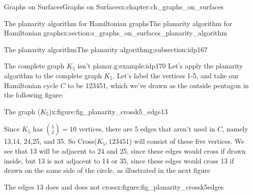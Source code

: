 \documentclass[oneside,10pt,]{book}
\numberwithin{equation}{section}
\begin{document}
\begin{chapterptx}{Graphs on Surfaces}{}{Graphs on Surfaces}{}{}{x:chapter:ch_graphs_on_surfaces}
\begin{sectionptx}{The planarity algorithm for Hamiltonian graphs}{}{The planarity algorithm for Hamiltonian graphs}{}{}{x:section:s_graphs_on_surfaces_planarity_algorithm}
\begin{subsectionptx}{The planarity algorithm}{}{The planarity algorithm}{}{}{g:subsection:idp167}
\begin{example}{The complete graph \(K_5\) isn't planar.}{g:example:idp170}%
Let's apply the planarity algorithm to the complete graph \(K_5\).  Let's label the vertices 1-5, and take our Hamiltonian cycle \(C\) to be 123451, which we've drawn as the outside pentagon in the following figure: \begin{figureptx}{The graph (\(K_5\))}{x:figure:fig_planarity_crossk5_edge13}{}%
\begin{image}{0.15}{0.7}{0.15}%
%
\end{image}%
\tcblower
\end{figureptx}%
 Since \(K_5\) has \(\binom{5}{2}=10\) vertices, there are 5 edges that aren't used in \(C\), namely 13,14, 24,25, and 35.  So Cross(\(K_5, 123451\)) will consist of these five vertices.  We see that 13 will be adjacent to 24 and 25, since these edges would cross if drawn inside, but 13 is not adjacent to 14 or 35, since these edges would cross 13 if drawn on the same side of the circle, as illustrated in the next figure%
\begin{figureptx}{The edges 13 does and does not cross}{x:figure:fig_planarity_crossk5edges}{}%
\begin{image}{0.15}{0.7}{0.15}%
\end{image}
\end{figureptx}
\end{example}
\end{subsectionptx}
\end{sectionptx}
\end{chapterptx}
\end{document}
